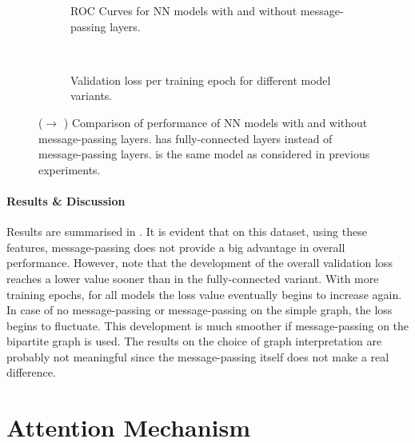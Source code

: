 \documentclass[
	fontsize=10pt, %
	twoside=true, %
	secnumdepth=1, %
  toc=indentunnumbered %
]{kaobook}
\begin{document}
\begin{figure}[h]
  \centering
  \begin{subfigure}[h]{0.48\linewidth}
    \caption{ROC Curves for NN models with and without message-passing layers.}
  \end{subfigure}
  ~~
  \begin{subfigure}[h]{0.48\linewidth}
    \caption{Validation loss per training epoch for different model variants.}
  \end{subfigure}
  \caption{(\ADLast $\rightarrow$ \PDMap) Comparison of performance of NN models
    with and without message-passing layers.  has
    fully-connected layers instead of message-passing layers.
     is the same model as considered in previous
    experiments. }
  \label{fig:importance-message-passing}
\end{figure}

\paragraph{Results \& Discussion} Results are summarised in
. It is evident that on this dataset,
using these features, message-passing does not provide a big
advantage in overall performance.
However, note that the development of the overall validation loss reaches a
lower value sooner than in the fully-connected variant. With more training
epochs, for all models the loss value eventually begins to increase again. In
case of no message-passing or message-passing on the simple graph, the loss
begins to fluctuate. This development is much smoother if message-passing on the
bipartite graph is used.
The results on the choice of graph interpretation are probably not meaningful
since the message-passing itself does not make a real difference.





\section{Attention Mechanism}
\end{document}

